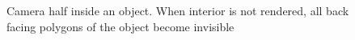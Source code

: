 \begin{itemize}
    \begin{figure}[h]
        \centering
        \hfill
        \caption{Camera half inside an object. When interior is not rendered, all back facing polygons of the object become invisible}
        \label{fig:interiorRendering}
    \end{figure}
    

\end{itemize}
